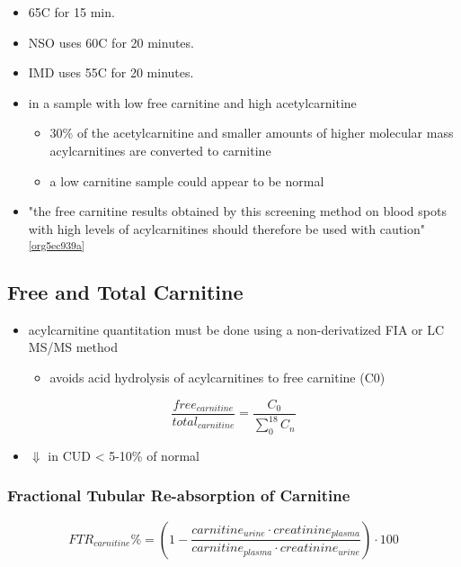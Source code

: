 \documentclass[12pt]{scrartcl}
\begin{document}
\begin{itemize}
\item 65\degree{}C for 15 min.
\item NSO uses 60\degree{}C for 20 minutes.
\item IMD uses 55\degree{}C for 20 minutes.

\item in a sample with low free carnitine and high acetylcarnitine
\begin{itemize}
\item 30\% of the acetylcarnitine and smaller amounts of higher
molecular mass acylcarnitines are converted to carnitine
\item a low carnitine sample could appear to be normal
\end{itemize}
\item "the free carnitine results obtained by this screening method on
blood spots with high levels of acylcarnitines should therefore be
used with caution" \textsuperscript{\ref{org5ec939a}}
\end{itemize}


\subsection{Free and Total Carnitine}
\label{sec:orga9cf878}
\begin{itemize}
\item acylcarnitine quantitation must be done using a non-derivatized FIA
or LC MS/MS method
\begin{itemize}
\item avoids acid hydrolysis of acylcarnitines to free carnitine (C0)
\end{itemize}
\end{itemize}

\[
\frac{free_{carnitine}}{total_{carnitine}} = \frac{C_0}{\sum_{0}^{18} C_n}
\]

\begin{itemize}
\item \(\Downarrow\) in CUD \textless{} 5-10\% of normal
\end{itemize}


\subsubsection{Fractional Tubular Re-absorption of Carnitine}
\label{sec:org8a2873d}

\begin{equation*}
FTR_{carnitine}\% = \left( 1 -  \frac{carnitine_{urine} \cdot creatinine_{plasma}}{carnitine_{plasma} \cdot creatinine_{urine}}\right) \cdot 100
\end{equation*}
\end{document}
